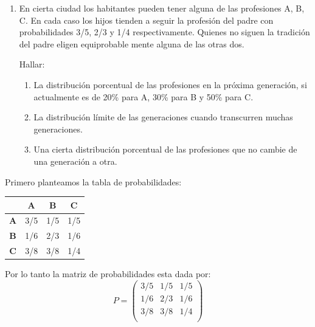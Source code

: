 \documentclass{templateNote}
\begin{document}
\begin{enumerate}[resume, start=10]

    \newpage
    \item En cierta ciudad los habitantes pueden tener alguna de las profesiones A, B, C. En cada
    caso los hijos tienden a seguir la profesión del padre con probabilidades 3/5, 2/3 y 1/4
    respectivamente. Quienes no siguen la tradición del padre eligen equiprobable mente
    alguna de las otras dos.

    Hallar:

    \begin{enumerate}[label=\alph*)]
        \item La distribución porcentual de las profesiones en la próxima generación, si actualmente es de 20\% para A, 30\% para B y 50\% para C.
        \item La distribución límite de las generaciones cuando transcurren muchas generaciones. 
        \item Una cierta distribución porcentual de las profesiones que no cambie de una generación a otra.
    \end{enumerate}

\end{enumerate}

Primero planteamos la tabla de probabilidades:
\begin{table}[H]
    \centering
    \begin{tabular}{|c|c|c|c|}
        \hline
        & \textbf{A} & \textbf{B} & \textbf{C} \\ \hline
        \textbf{A} & 3/5 & 1/5 & 1/5 \\ 
        \textbf{B} & 1/6 & 2/3 & 1/6 \\ 
        \textbf{C} & 3/8 & 3/8 & 1/4 \\ \hline
    \end{tabular}
\end{table}
Por lo tanto la matriz de probabilidades esta dada por:
\begin{equation*}
    P = 
    \begin{pmatrix}
        3/5 & 1/5 & 1/5 \\
        1/6 & 2/3 & 1/6 \\
        3/8 & 3/8 & 1/4 \\
    \end{pmatrix}
\end{equation*}
\end{document}
